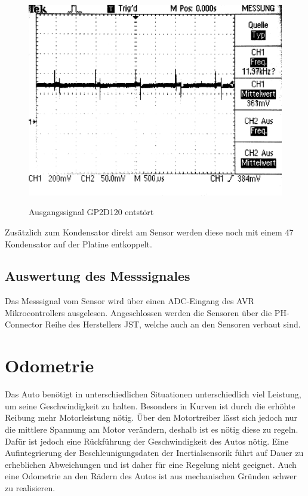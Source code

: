 \begin{figure}[H]
\centering
\includegraphics[width=.8\textwidth]{IR_lessspikes.png}\\
\caption{Ausgangssignal GP2D120 entstört}%
\label{fig:IR_lessspikes}
\end{figure}

Zusätzlich zum Kondensator direkt am Sensor werden diese noch mit einem \SI{47}{\uF} Kondensator auf der Platine entkoppelt.

\subsection{Auswertung des Messsignales}
Das Messsignal vom Sensor wird über einen ADC-Eingang des AVR Mikrocontrollers ausgelesen. Angeschlossen werden die Sensoren über die PH-Connector Reihe des Herstellers JST, welche auch an den Sensoren verbaut sind.



\section{Odometrie}
Das Auto benötigt in unterschiedlichen Situationen unterschiedlich viel Leistung, um seine Geschwindigkeit zu halten.
Besonders in Kurven ist durch die erhöhte Reibung mehr Motorleistung nötig. Über den Motortreiber lässt sich jedoch nur
die mittlere Spannung am Motor verändern, deshalb ist es nötig diese zu regeln. Dafür ist jedoch eine Rückführung der Geschwindigkeit
des Autos nötig. Eine Aufintegrierung der Beschleunigungsdaten der Inertialsensorik führt auf Dauer zu erheblichen
Abweichungen und ist daher für eine Regelung nicht geeignet. Auch eine Odometrie an den Rädern des Autos ist
aus mechanischen Gründen schwer zu realisieren. 

